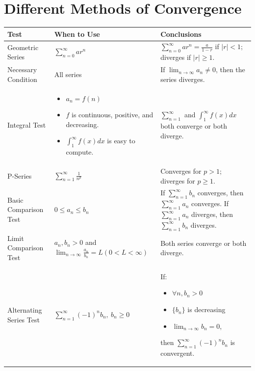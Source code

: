 \documentclass{article}
\begin{document}
\section{Different Methods of Convergence}
\begin{center}
    {\renewcommand{\arraystretch}{1.5}
    \begin{tabular}{| p{2cm} | p{6.75cm} | p{6.75cm} | }
        \hline
        Test & When to Use & Conclusions \\
        \hline
        \hline
        Geometric Series & $\sum_{n=0}^\infty ar^n$ & $\sum_{n=0}^\infty ar^n = \frac{a}{1-r}$ if $|r| < 1$; diverges if $|r| \geq 1$. \\
        \hline
        Necessary Condition & All series & If $\lim_{n\to\infty}a_n \neq 0$, then the series diverges.\\
        \hline
        Integral Test & \setlist{nolistsep}\begin{itemize}[noitemsep]
            \item $a_n = f(n)$
            \item $f$ is continuous, positive, and decreasing.
            \item $\int_1^\infty f(x) dx$ is easy to compute.
        \end{itemize} 
        & $\sum_{n=1}^\infty$ and $\int_1^\infty f(x) dx$ both converge or both diverge.\\
        \hline
        P-Series & $\sum_{n=1}^\infty \frac{1}{n^p}$ & Converges for $p>1$; diverges for $p \geq 1$.\\
        \hline
        Basic Comparison Test & $0 \leq a_n \leq b_n$ & If $\sum_{n=1}^\infty b_n$ converges, then $\sum_{n=1}^\infty a_n$ converges. If $\sum_{n=1}^\infty a_n$ diverges, then $\sum_{n=1}^\infty b_n$ diverges. \\ 
        \hline
        Limit Comparison Test & $a_n, b_n > 0$ and $\lim_{n\to\infty}\frac{a_n}{b_n} = L (0 < L < \infty)$ & Both series converge or both diverge.  \\
        \hline
        Alternating Series Test & $\sum_{n=1}^\infty (-1)^n b_n, \ b_n \geq 0$ & If: \setlist{nolistsep}\begin{itemize}[noitemsep]
            \item $\forall n, b_n > 0$
            \item $\{b_n\}$ is decreasing
            \item $\lim_{n\to\infty} b_n = 0$, 
        \end{itemize}
        then $\sum_{n=1}^\infty (-1)^n b_n$ is convergent. \\

\end{tabular}}
\end{center}
\end{document}
